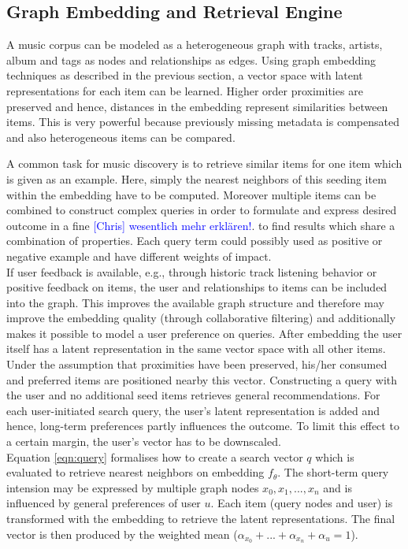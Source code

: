 \documentclass[sigconf]{acmart}
\newcommand{\ce}[1]{\textcolor{blue}{[Chris] #1}}
\newcommand{\ce}[1]{}
\begin{document}
\subsection{Graph Embedding and Retrieval Engine}

A music corpus can be modeled as a heterogeneous graph with tracks, artists, album and tags as nodes and relationships as edges. Using graph embedding techniques as described in the previous section, a vector space with latent representations for each item can be learned. Higher order proximities are preserved and hence, distances in the embedding represent similarities between items. This is very powerful because previously missing metadata is compensated and also heterogeneous items can be compared. 

A common task for music discovery is to retrieve similar items for one item which is given as an example. Here, simply the nearest neighbors of this seeding item within the embedding have to be computed. Moreover multiple items can be combined to construct complex queries in order to formulate and express desired outcome in a fine \ce{wesentlich mehr erklären!}.  to find results which share a combination of properties. Each query term could possibly used as positive or negative example and have different weights of impact. \\


If user feedback is available, e.g., through historic track listening behavior or positive feedback on items, the user and relationships to items can be included into the graph. This improves the available graph structure and therefore may improve the embedding quality (through collaborative filtering) and additionally makes it possible to model a user preference on queries. After embedding the user itself has a latent representation in the same vector space with all other items. Under the assumption that proximities have been preserved, his/her consumed and preferred items are positioned nearby this vector. Constructing a query with the user and no additional seed items retrieves general recommendations. For each user-initiated search query, the user's latent representation is added and hence, long-term preferences partly influences the outcome. To limit this effect to a certain margin, the user's vector has to be downscaled. \\


Equation \ref{eqn:query} formalises how to create a search vector $ q $ which is evaluated to retrieve nearest neighbors on embedding $ f_{\theta} $. The short-term query intension may be expressed by multiple graph nodes $ x_{0}, x_{1}, ..., x_{n} $ and is influenced by general preferences of user $ u $. Each item (query nodes and user) is transformed with the embedding to retrieve the latent representations. The final vector is then produced by the weighted mean ($ \alpha_{x_{0}} + ... + \alpha_{x_{n}} + \alpha_{u} = 1 $).
 
\end{document}
